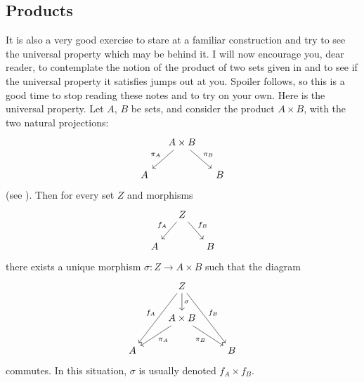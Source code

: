 \subsection{Products}%
\label{subsec:prelims:products}
It is also a very good exercise to stare at a familiar construction
and try to see the universal property which may be behind it. I will
now encourage you, dear reader, to contemplate the notion of the
product of two sets given in
 and to see if the
universal property it satisfies jumps out at you.  Spoiler follows, so
this is a good time to stop reading these notes and to try on your
own.  Here is the universal property. Let $A$, $B$ be sets, and
consider the product $A \times B$, with the two natural projections:
\[
  \begin{tikzcd}[column sep=small]
    & A \times B \arrow[dl, "\pi_A"'] \arrow[dr, "\pi_B"] & \\
    A & & B
  \end{tikzcd}
\]
(see ). Then for every set
$Z$ and morphisms
\[
  \begin{tikzcd}[column sep=small]
    & Z \arrow[dl, "f_A"'] \arrow[dr, "f_B"] & \\
    A & & B
  \end{tikzcd}
\]
there exists a unique morphism $\sigma \colon Z \to A \times B$ such
that the diagram
\[
  \begin{tikzcd}
    & Z \arrow[d, "\sigma"] \arrow[ddl, "f_A"'] \arrow[ddr, "f_B"] & \\
    & A \times B \arrow[dl, "\pi_A"] \arrow[dr, "\pi_B"'] & \\
    A & & B
  \end{tikzcd}
\]
commutes. In this situation, $\sigma$ is usually denoted
$f_A \times f_B$.

